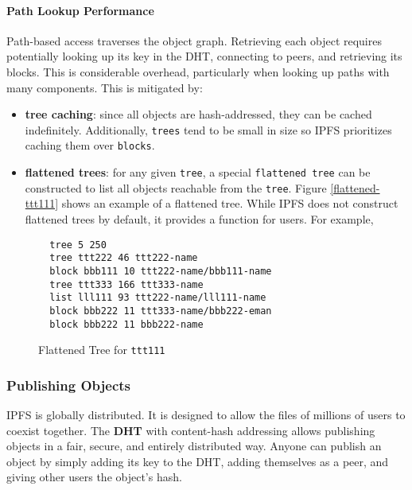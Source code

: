 \documentclass{sig-alternate}
\begin{document}
\paragraph{Path Lookup Performance}

Path-based access traverses the object graph. Retrieving
each object requires potentially looking up its key in the DHT,
connecting to peers, and retrieving its blocks. This is considerable
overhead, particularly when looking up paths with many components.
This is mitigated by:
\begin{itemize}
  \item \textbf{tree caching}: since all objects are hash-addressed, they
        can be cached indefinitely. Additionally, \texttt{trees} tend to be
        small in size so IPFS prioritizes caching them over \texttt{blocks}.
  \item \textbf{flattened trees}: for any given \texttt{tree}, a special
        \texttt{flattened tree} can be constructed to list all objects
        reachable from the \texttt{tree}. Figure \ref{flattened-ttt111} shows
        an example of a flattened tree. While IPFS does not construct flattened
        trees by default, it provides a function for users. For example,
\end{itemize}

\begin{figure}
\begin{verbatim}
  tree 5 250
  tree ttt222 46 ttt222-name
  block bbb111 10 ttt222-name/bbb111-name
  tree ttt333 166 ttt333-name
  list lll111 93 ttt222-name/lll111-name
  block bbb222 11 ttt333-name/bbb222-eman
  block bbb222 11 bbb222-name
\end{verbatim}
\caption{Flattened Tree for \texttt{ttt111}} \label{fig:flattened-ttt111}
\end{figure}


\subsubsection{Publishing Objects}

IPFS is globally distributed. It is designed to allow the files of millions
of users to coexist together. The \textbf{DHT} with content-hash addressing
allows publishing objects in a fair, secure, and entirely distributed way.
Anyone can publish an object by simply adding its key to the DHT, adding
themselves as a peer, and giving other users the object's hash.
\end{document}
